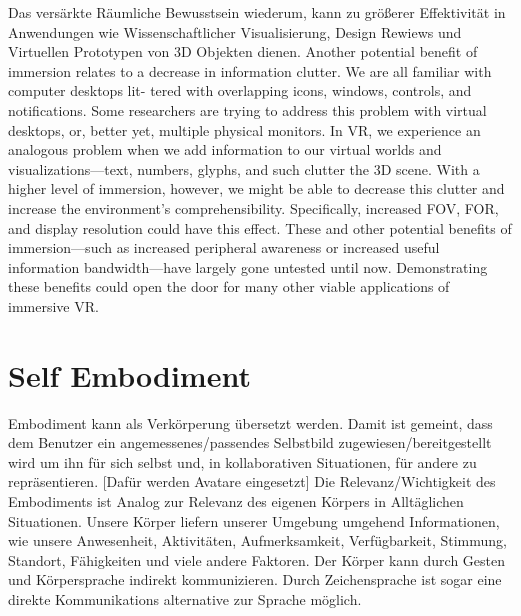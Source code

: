 Das versärkte Räumliche Bewusstsein wiederum, kann zu größerer Effektivität in Anwendungen wie Wissenschaftlicher Visualisierung, Design Rewiews und Virtuellen Prototypen von 3D Objekten dienen.
Another potential benefit of immersion relates to a decrease in
information clutter. We are all familiar with computer desktops lit-
tered with overlapping icons, windows, controls, and notifications.
Some researchers are trying to address this problem with virtual
desktops, or, better yet, multiple physical monitors.
In VR, we experience an analogous problem when we add
information to our virtual worlds and visualizations—text,
numbers, glyphs, and such clutter the 3D scene. With a higher
level of immersion, however, we might be able to decrease
this clutter and increase the environment’s comprehensibility.
Specifically, increased FOV, FOR, and display resolution could
have this effect.
These and other potential benefits of immersion—such as
increased peripheral awareness or increased useful information
bandwidth—have largely gone untested until now. Demonstrating
these benefits could open the door for many other viable applications of immersive VR.


\section{Self Embodiment}
Embodiment kann als Verkörperung übersetzt werden. Damit ist gemeint, dass dem Benutzer ein angemessenes/passendes Selbstbild zugewiesen/bereitgestellt wird um ihn für sich selbst und, in kollaborativen Situationen, für andere zu repräsentieren. [Dafür werden Avatare eingesetzt]
Die Relevanz/Wichtigkeit des Embodiments ist Analog zur Relevanz des eigenen Körpers in Alltäglichen Situationen. Unsere Körper liefern unserer Umgebung umgehend Informationen, wie unsere Anwesenheit, Aktivitäten, Aufmerksamkeit, Verfügbarkeit, Stimmung, Standort, Fähigkeiten und viele andere Faktoren. Der Körper kann durch Gesten und Körpersprache indirekt kommunizieren. Durch Zeichensprache ist sogar eine direkte Kommunikations alternative zur Sprache möglich.\cite{Benford2010}

